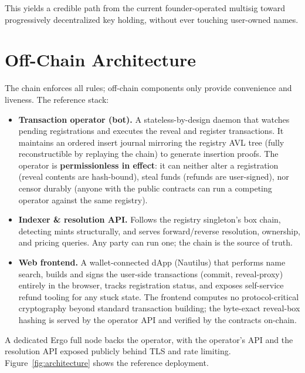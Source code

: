 \documentclass[11pt]{article}
\begin{document}
This yields a credible path from the current founder-operated multisig toward
progressively decentralized key holding, without ever touching user-owned
names.

\section{Off-Chain Architecture}

The chain enforces all rules; off-chain components only provide convenience
and liveness. The reference stack:

\begin{itemize}
  \item \textbf{Transaction operator (bot).} A stateless-by-design daemon
        that watches pending registrations and executes the reveal and
        register transactions. It maintains an ordered insert journal
        mirroring the registry AVL tree (fully reconstructible by replaying
        the chain) to generate insertion proofs. The operator is
        \textbf{permissionless in effect}: it can neither alter a
        registration (reveal contents are hash-bound), steal funds (refunds
        are user-signed), nor censor durably (anyone with the public
        contracts can run a competing operator against the same registry).
  \item \textbf{Indexer \& resolution API.} Follows the registry singleton's
        box chain, detecting mints structurally, and serves forward/reverse
        resolution, ownership, and pricing queries. Any party can run one;
        the chain is the source of truth.
  \item \textbf{Web frontend.} A wallet-connected dApp (Nautilus) that
        performs name search, builds and signs the user-side transactions
        (commit, reveal-proxy) entirely in the browser, tracks registration
        status, and exposes self-service refund tooling for any stuck state.
        The frontend computes no protocol-critical cryptography beyond
        standard transaction building; the byte-exact reveal-box hashing is
        served by the operator API and verified by the contracts on-chain.
\end{itemize}

A dedicated Ergo full node backs the operator, with the operator's API and
the resolution API exposed publicly behind TLS and rate limiting.
Figure~\ref{fig:architecture} shows the reference deployment.
\end{document}
